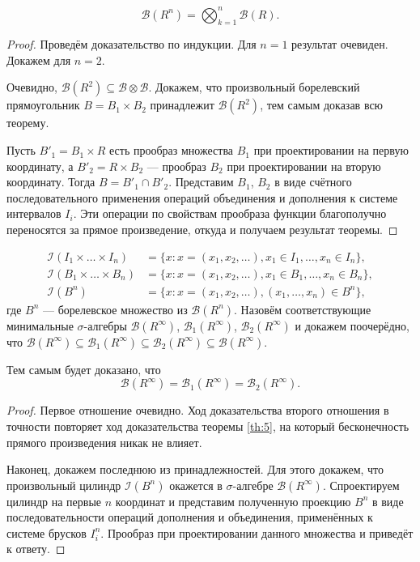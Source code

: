 \begin{theorem}\label{th:5}
 
\[
  \mathscr B(R^n) = \bigotimes_{k=1}^n \mathscr B(R).
\]

\end{theorem}
\begin{proof}
    Проведём доказательство по индукции. Для $ n=1 $ результат очевиден. Докажем
    для $ n=2 $.

    Очевидно, $ \mathscr B(R^2) \subseteq \mathscr B \otimes \mathscr B $.
    Докажем, что произвольный борелевский прямоугольник $ B = B_1 \times B_2 $
    принадлежит $
    \mathscr B(R^2) $, тем самым доказав всю теорему.

    Пусть $ B'_1 = B_1 \times R $ есть прообраз множества $ B_1 $ при
    проектировании на первую координату, а $ B'_2 = R \times B_2 $ --- прообраз
    $ B_2 $ при проектировании на вторую координату. Тогда $ B = B'_1
    \cap B'_2 $. Представим $ B_1 $, $ B_2 $ в виде счётного последовательного
    применения операций объединения и дополнения к системе интервалов $ I_i $.
    Эти операции по свойствам прообраза функции благополучно переносятся за прямое произведение, откуда и
    получаем результат теоремы.
\end{proof}

\begin{align*}
  \mathscr I(I_1 \times \ldots \times I_n) &= \{x\colon x = (x_1, x_2, \ldots),
  x_1 \in I_1, \ldots, x_n \in I_n\},\\
    \mathscr I(B_1 \times \ldots \times B_n) &= \{x\colon x = (x_1, x_2, \ldots),
  x_1 \in B_1, \ldots, x_n \in B_n\},\\
      \mathscr I(B^n) &= \{x\colon x=(x_1, x_2, \ldots), (x_1, \ldots, x_n) \in
      B^n\},
\end{align*}
где $ B^n $ --- борелевское множество из $ \mathscr B(R^n) $. Назовём
соответствующие минимальные $ \sigma $-алгебры $ \mathscr B(R^\infty) $, $
\mathscr B_1(R^\infty) $, $ \mathscr B_2(R^\infty) $ и докажем поочерёдно, что $ \mathscr
B(R^\infty) \subseteq \mathscr B_1(R^\infty) \subseteq \mathscr B_2(R^\infty)
\subseteq \mathscr B(R^\infty) $.

\begin{theorem}
  Тем самым будет доказано, что  
  \[
      \mathscr B(R^\infty) = \mathscr B_1(R^\infty) = \mathscr B_2(R^\infty).
  \]
\end{theorem} 
\begin{proof}
  Первое отношение очевидно. Ход доказательства второго отношения в точности
  повторяет ход доказательства теоремы \ref{th:5}, на который бесконечность
  прямого произведения никак не влияет. 

  Наконец, докажем последнюю из принадлежностей. Для этого докажем, что
  произвольный цилиндр $ \mathscr I(B^n) $ окажется в $ \sigma $-алгебре $
  \mathscr B(R^\infty) $. Спроектируем цилиндр на первые $ n $ координат и
  представим полученную проекцию $ B^n $ в виде последовательности операций дополнения и
  объединения, применённых к системе брусков $ I^n_i $. Прообраз при
  проектировании данного множества и приведёт к ответу.
\end{proof}


